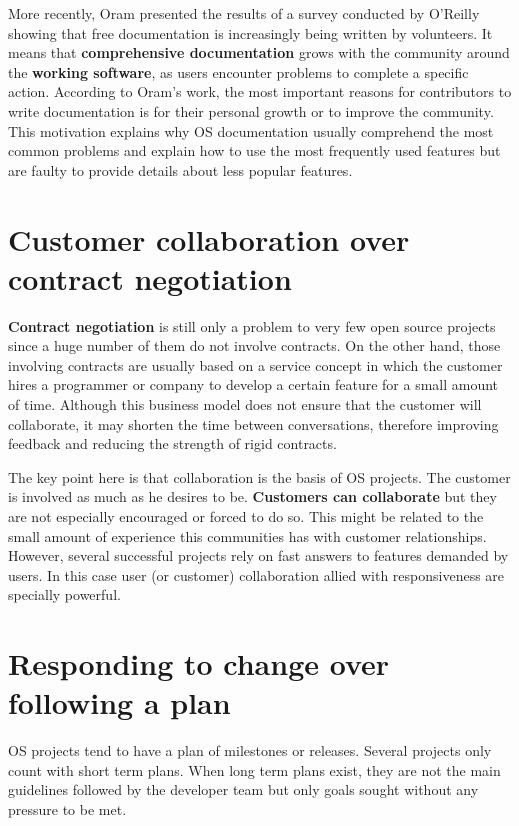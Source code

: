 More recently, Oram \cite{Oram2007} presented the results of a survey
conducted by O'Reilly showing that free documentation is increasingly
being written by volunteers. It means that \textbf{comprehensive
  documentation} grows with the community around the \textbf{working
  software}, as users encounter problems to complete a specific
action. According to Oram's work, the most important reasons for
contributors to write documentation is for their personal growth or to
improve the community. This motivation explains why OS documentation
usually comprehend the most common problems and explain how to use the
most frequently used features but are faulty to provide details about
less popular features.

\section{Customer collaboration over contract negotiation}
\label{sec:third-princ}

\textbf{Contract negotiation} is still only a problem to very few open
source projects since a huge number of them do not involve
contracts. On the other hand, those involving contracts are usually
based on a service concept in which the customer hires a programmer or
company to develop a certain feature for a small amount of
time. Although this business model does not ensure that the customer
will collaborate, it may shorten the time between conversations,
therefore improving feedback and reducing the strength of rigid
contracts.

The key point here is that collaboration is the basis of OS
projects. The customer is involved as much as he desires to
be. \textbf{Customers can collaborate} but they are not especially
encouraged or forced to do so. This might be related to the small
amount of experience this communities has with customer
relationships. However, several successful projects rely on fast
answers to features demanded by users. In this case user (or customer)
collaboration allied with responsiveness are specially powerful.

\section{Responding to change over following a plan}
\label{sec:fourth-princ}

OS projects tend to have a plan of milestones or releases. Several
projects only count with short term plans. When long term plans exist,
they are not the main guidelines followed by the developer team but
only goals sought without any pressure to be
met. %

